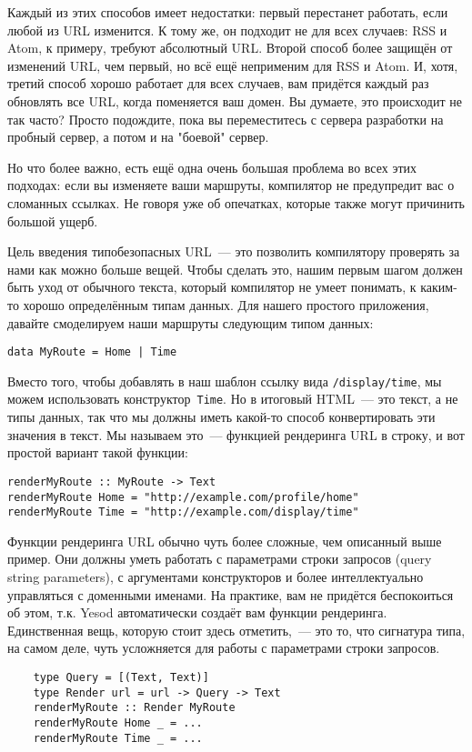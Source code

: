 Каждый из этих способов имеет недостатки: первый перестанет работать, если
любой из URL изменится. К тому же, он подходит не для всех случаев: RSS и Atom,
к примеру, требуют абсолютный URL. Второй способ более защищён от изменений
URL, чем первый, но всё ещё неприменим для RSS и Atom.  И, хотя, третий способ
хорошо работает для всех случаев, вам придётся каждый раз обновлять все URL,
когда поменяется ваш домен.  Вы думаете, это происходит не так часто? Просто
подождите, пока вы переместитесь с сервера разработки на пробный сервер, а
потом и на "боевой" сервер.

Но что более важно, есть ещё одна очень большая проблема во всех этих подходах:
если вы изменяете ваши маршруты, компилятор не предупредит вас о сломанных
ссылках. Не говоря уже об опечатках, которые также могут причинить большой
ущерб.

Цель введения типобезопасных URL~--- это позволить компилятору проверять за
нами как можно больше вещей. Чтобы сделать это, нашим первым шагом должен быть
уход от обычного текста, который компилятор не умеет понимать, к каким-то
хорошо определённым типам данных. Для нашего простого приложения, давайте
смоделируем наши маршруты следующим типом данных:

\begin{lstlisting}
data MyRoute = Home | Time
\end{lstlisting}

Вместо того, чтобы добавлять в наш шаблон ссылку вида \texttt{/display/time},
мы можем использовать конструктор~\lstinline'Time'. Но в итоговый HTML~--- это
текст, а не типы данных, так что мы должны иметь какой-то способ конвертировать
эти значения в текст.  Мы называем это~--- функцией рендеринга URL в строку,
и вот простой вариант такой функции:

\begin{lstlisting}
renderMyRoute :: MyRoute -> Text
renderMyRoute Home = "http://example.com/profile/home"
renderMyRoute Time = "http://example.com/display/time"
\end{lstlisting}

\begin{remark}
    Функции рендеринга URL обычно чуть более сложные, чем описанный выше
    пример.  Они должны уметь работать с параметрами строки запросов (query
    string parameters), с аргументами конструкторов и более интеллектуально
    управляться с доменными именами.  На практике, вам не придётся беспокоиться
    об этом, т.к. Yesod автоматически создаёт вам функции рендеринга.
    Единственная вещь, которую стоит здесь отметить,~--- это то, что сигнатура
    типа, на самом деле, чуть усложняется для работы с параметрами строки
    запросов.

    \begin{lstlisting}
    type Query = [(Text, Text)]
    type Render url = url -> Query -> Text
    renderMyRoute :: Render MyRoute
    renderMyRoute Home _ = ...
    renderMyRoute Time _ = ...
    \end{lstlisting}
\end{remark}

